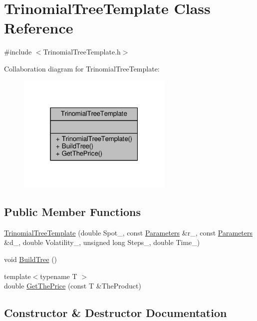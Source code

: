 \hypertarget{classTrinomialTreeTemplate}{}\section{Trinomial\+Tree\+Template Class Reference}
\label{classTrinomialTreeTemplate}


{\ttfamily \#include $<$Trinomial\+Tree\+Template.\+h$>$}



Collaboration diagram for Trinomial\+Tree\+Template\+:
\nopagebreak
\begin{figure}[H]
\begin{center}
\leavevmode
\includegraphics[width=211pt]{classTrinomialTreeTemplate__coll__graph}
\end{center}
\end{figure}
\subsection*{Public Member Functions}
\begin{DoxyCompactItemize}
\item 
\hyperlink{classTrinomialTreeTemplate_a170ff5c84290987e221fea1971ced896}{Trinomial\+Tree\+Template} (double Spot\+\_\+, const \hyperlink{classParameters}{Parameters} \&r\+\_\+, const \hyperlink{classParameters}{Parameters} \&d\+\_\+, double Volatility\+\_\+, unsigned long Steps\+\_\+, double Time\+\_\+)
\item 
void \hyperlink{classTrinomialTreeTemplate_aa923006b38e206390573624227692aae}{Build\+Tree} ()
\item 
{\footnotesize template$<$typename T $>$ }\\double \hyperlink{classTrinomialTreeTemplate_a3b94ed75af412cac1e2249ef97daa8e6}{Get\+The\+Price} (const T \&The\+Product)
\end{DoxyCompactItemize}


\subsection{Constructor \& Destructor Documentation}
\hypertarget{classTrinomialTreeTemplate_a170ff5c84290987e221fea1971ced896}{}\label{classTrinomialTreeTemplate_a170ff5c84290987e221fea1971ced896} 
